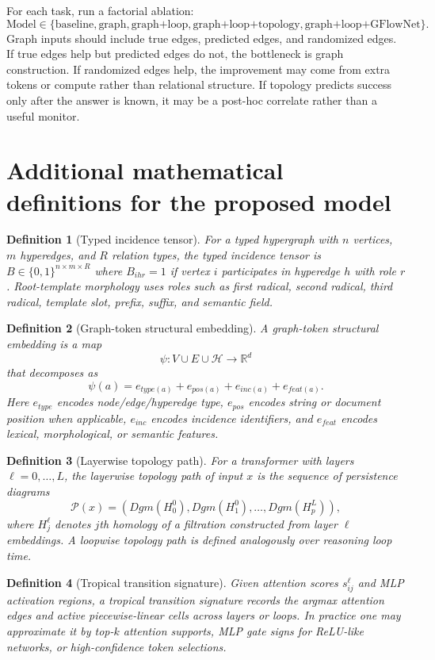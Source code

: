 \documentclass[11pt]{article}
\newtheorem{definition}{Definition}[section]
\newcommand{\R}{\mathbb{R}}
\newcommand{\1}{\mathbf{1}}
\begin{document}
For each task, run a factorial ablation:
\[
\text{Model} \in \{\text{baseline},\text{graph},\text{graph+loop},\text{graph+loop+topology},\text{graph+loop+GFlowNet}\}.
\]
Graph inputs should include true edges, predicted edges, and randomized edges. If true edges help but predicted edges do not, the bottleneck is graph construction. If randomized edges help, the improvement may come from extra tokens or compute rather than relational structure. If topology predicts success only after the answer is known, it may be a post-hoc correlate rather than a useful monitor.

\section{Additional mathematical definitions for the proposed model}

\begin{definition}[Typed incidence tensor]
For a typed hypergraph with $n$ vertices, $m$ hyperedges, and $R$ relation types, the typed incidence tensor is $B\in\{0,1\}^{n\times m\times R}$ where $B_{ihr}=1$ if vertex $i$ participates in hyperedge $h$ with role $r$. Root-template morphology uses roles such as first radical, second radical, third radical, template slot, prefix, suffix, and semantic field.
\end{definition}

\begin{definition}[Graph-token structural embedding]
A graph-token structural embedding is a map
\[
\psi:V\cup E\cup\mathcal{H}\to\R^d
\]
that decomposes as
\[
\psi(a)=e_{type(a)}+e_{pos(a)}+e_{inc(a)}+e_{feat(a)}.
\]
Here $e_{type}$ encodes node/edge/hyperedge type, $e_{pos}$ encodes string or document position when applicable, $e_{inc}$ encodes incidence identifiers, and $e_{feat}$ encodes lexical, morphological, or semantic features.
\end{definition}

\begin{definition}[Layerwise topology path]
For a transformer with layers $\ell=0,\ldots,L$, the layerwise topology path of input $x$ is the sequence of persistence diagrams
\[
\mathcal{P}(x)=(Dgm(H_0^0),Dgm(H_1^0),\ldots,Dgm(H_p^L)),
\]
where $H_j^\ell$ denotes $j$th homology of a filtration constructed from layer $\ell$ embeddings. A loopwise topology path is defined analogously over reasoning loop time.
\end{definition}

\begin{definition}[Tropical transition signature]
Given attention scores $s_{ij}^\ell$ and MLP activation regions, a tropical transition signature records the argmax attention edges and active piecewise-linear cells across layers or loops. In practice one may approximate it by top-$k$ attention supports, MLP gate signs for ReLU-like networks, or high-confidence token selections.
\end{definition}
\end{document}
